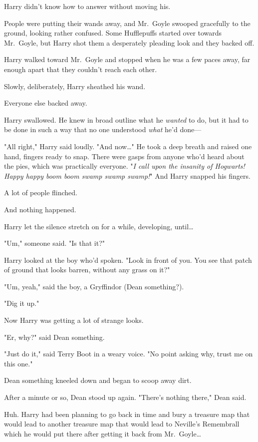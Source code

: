 Harry didn't know how to answer without moving his.

People were putting their wands away, and Mr.~Goyle swooped gracefully to the
ground, looking rather confused. Some Hufflepuffs started over towards
Mr.~Goyle, but Harry shot them a desperately pleading look and they backed off.

Harry walked toward Mr.~Goyle and stopped when he was a few paces away, far
enough apart that they couldn't reach each other.

Slowly, deliberately, Harry sheathed his wand.

Everyone else backed away.

Harry swallowed. He knew in broad outline what he \emph{wanted} to do, but it
had to be done in such a way that no one understood \emph{what} he'd done---

"All right," Harry said loudly. "And now{\ldots}" He took a deep breath and
raised one hand, fingers ready to snap. There were gasps from anyone who'd
heard about the pies, which was practically everyone. "\emph{I call upon the
insanity of Hogwarts! Happy happy boom boom swamp swamp swamp!}" And Harry
snapped his fingers.

A lot of people flinched.

And nothing happened.

Harry let the silence stretch on for a while, developing, until{\ldots}

"Um," someone said. "Is that it?"

Harry looked at the boy who'd spoken. "Look in front of you. You see that patch
of ground that looks barren, without any grass on it?"

"Um, yeah," said the boy, a Gryffindor (Dean something?).

"Dig it up."

Now Harry was getting a lot of strange looks.

"Er, why?" said Dean something.

"Just do it," said Terry Boot in a weary voice. "No point asking why, trust me
on this one."

Dean something kneeled down and began to scoop away dirt.

After a minute or so, Dean stood up again. "There's nothing there," Dean said.

Huh. Harry had been planning to go back in time and bury a treasure map that
would lead to another treasure map that would lead to Neville's Remembrall
which he would put there after getting it back from Mr.~Goyle{\ldots}

